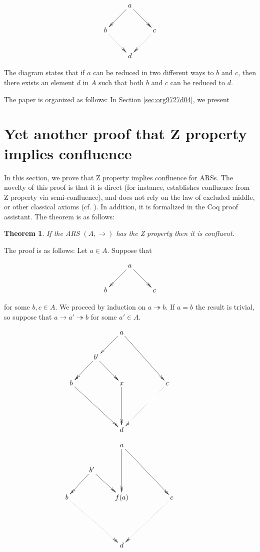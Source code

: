 \documentclass[11pt]{article}
\newtheorem{theorem}{Theorem}[section]
\newcommand{\tto}{\twoheadrightarrow}
\begin{document}
\[
  \xymatrix{
    & a \ar@{->>}[dl] \ar@{->>}[dr] & \\
    b \ar@{.>>}[dr] &  & c \ar@{.>>}[dl] \\
    & d & 
  }
\]

The diagram states that if \(a\) can be reduced in two different ways
to \(b\) and \(c\), then there exists an element \(d\) in \(A\) such
that both \(b\) and \(c\) can be reduced to \(d\). 

The paper is organized as follows: In Section \ref{sec:org9727d04}, we present 

\section{Yet another proof that Z property implies confluence}
\label{sec:org7fb54b5}

In this section, we prove that Z property implies confluence for
ARSs. The novelty of this proof is that it is direct (for instance,
\cite{2016arXiv160903139N} establishes confluence from Z property via
semi-confluence), and does not rely on the law of excluded middle, or
other classical axioms
(cf. \cite{kesner09:_theor_explic_subst_with_safe_full_compos}). In
addition, it is formalized in the Coq proof assistant. The theorem is as follows:

\begin{theorem}
If the ARS \((A,\to)\) has the Z property then it is confluent.
\end{theorem}

The proof is as follows: Let \(a\in A\). Suppose that

\[
  \xymatrix{
    & a \ar@{->>}[dl] \ar@{->>}[dr] & \\
    b  &  & c 
  }
\]

\noindent for some \(b,c\in A\). We proceed by induction on \(a \tto
b\). If \(a=b\) the result is trivial, so suppose that \(a \to a' \tto
b\) for some \(a'\in A\). 

\[
  \xymatrix{
    & & a \ar@{->}[dl] \ar@{->>}[ddrr] & & \\
    & b' \ar@{->>}[dl] \ar@[blue]@{->>}[dr] & & & \\
    b \ar@[red]@{->>}[ddrr] & & x \ar@[red]@{->>}[dd] & &  c \ar@{.>>}[ddll] \\
    & & & & & \\
    & & d & &
   }
  \]

\[
  \xymatrix{
    & & a \ar@{->>}[dd] \ar@{->>}[ddrr] & & \\
    & b' \ar@{->>}[dl] \ar@{->>}[dr] & & & \\
    b \ar@{.>>}[ddrr] & & f(a) & &  c \ar@{.>>}[ddll] \\
    & & & & & \\
    & & d & &
   }
  \]
\end{document}
